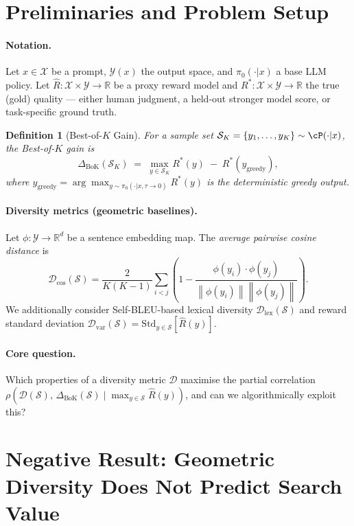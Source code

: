 \documentclass{article}
\newtheorem{definition}{Definition}
\newcommand{\R}{\mathbb{R}}
\newcommand{\cS}{\mathcal{S}}
\newcommand{\cY}{\mathcal{Y}}
\newcommand{\cX}{\mathcal{X}}
\newcommand{\Rhat}{\hat{R}}
\newcommand{\Rstar}{R^{*}}
\newcommand{\Dcos}{\mathcal{D}_{\mathrm{cos}}}
\newcommand{\Dlex}{\mathcal{D}_{\mathrm{lex}}}
\newcommand{\Dvar}{\mathcal{D}_{\mathrm{var}}}
\newcommand{\DeltaBoK}{\Delta_{\mathrm{BoK}}}
\newcommand{\pibase}{\pi_0}
\newcommand{\norm}[1]{\left\|#1\right\|}
\begin{document}
\section{Preliminaries and Problem Setup}
\label{sec:setup}

\paragraph{Notation.}
Let $x \in \cX$ be a prompt, $\cY(x)$ the output space, and $\pibase(\cdot|x)$
a base LLM policy.  Let $\Rhat : \cX \times \cY \to \R$ be a proxy reward
model and $\Rstar : \cX \times \cY \to \R$ the true (gold) quality --- either
human judgment, a held-out stronger model score, or task-specific ground truth.

\begin{definition}[Best-of-$K$ Gain]
For a sample set $\cS_K = \{y_1,\dots,y_K\} \sim \cP(\cdot|x)$, the
\emph{Best-of-$K$ gain} is
\[
  \DeltaBoK(\cS_K) \;=\; \max_{y \in \cS_K} \Rstar(y) \;-\; \Rstar(y_{\mathrm{greedy}}),
\]
where $y_{\mathrm{greedy}} = \arg\max_{y \sim \pibase(\cdot|x,\tau\to 0)} \Rstar(y)$
is the deterministic greedy output.
\end{definition}

\paragraph{Diversity metrics (geometric baselines).}
Let $\phi:\cY\to\R^d$ be a sentence embedding map.  The
\emph{average pairwise cosine distance} is
\[
  \Dcos(\cS) = \frac{2}{K(K-1)} \sum_{i<j}
  \left(1 - \frac{\phi(y_i)\cdot\phi(y_j)}{\norm{\phi(y_i)}\norm{\phi(y_j)}}\right).
\]
We additionally consider Self-BLEU-based lexical diversity $\Dlex(\cS)$ and
reward standard deviation $\Dvar(\cS) = \mathrm{Std}_{y\in\cS}[\Rhat(y)]$.

\paragraph{Core question.}
Which properties of a diversity metric $\mathcal{D}$ maximise the partial
correlation $\rho(\mathcal{D}(\cS),\,\DeltaBoK(\cS)\mid \max_{y\in\cS}\Rhat(y))$,
and can we algorithmically exploit this?

\section{Negative Result: Geometric Diversity Does Not Predict Search Value}
\label{sec:negative}
\end{document}
